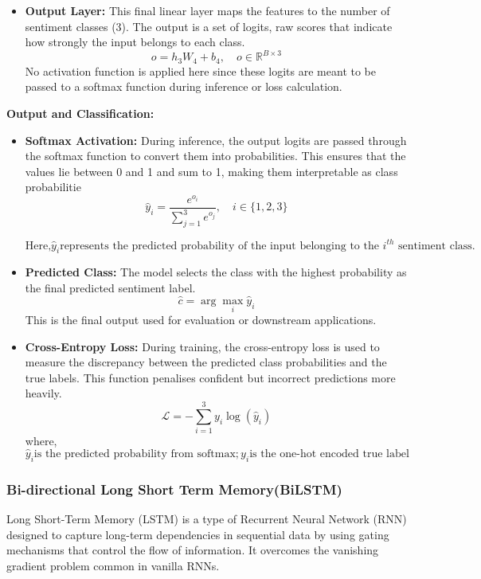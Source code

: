 \documentclass{article}
\begin{document}
\begin{itemize}
\begin{itemize}
\item \textbf{Output Layer:}
This final linear layer maps the features to the number of sentiment classes (3). The output is a set of logits, raw scores that indicate how strongly the input belongs to each class.
\[
o = h_3W_4 + b_4, \quad o \in \mathbb{R}^{B \times 3}
\]
No activation function is applied here since these logits are meant to be passed to a softmax function during inference or loss calculation.

\end{itemize}
\end{itemize}

\textbf{Output and Classification:}

\begin{itemize}
\item \textbf{Softmax Activation:}
During inference, the output logits are passed through the softmax function to convert them into probabilities. This ensures that the values lie between 0 and 1 and sum to 1, making them interpretable as class probabilitie
\[
\hat{y}_i = \frac{e^{o_i}}{\sum_{j=1}^{3} e^{o_j}}, \quad i \in \{1, 2, 3\}
\]

\[\text{Here,} \hat{y}_i  \text{represents the predicted probability of the input belonging to the } {i^{th}}  \text{ sentiment class.}\]

\item \textbf{Predicted Class:}
The model selects the class with the highest probability as the final predicted sentiment label.
\[
\hat{c} = \arg\max_i \hat{y}_i
\]
This is the final output used for evaluation or downstream applications.

\item \textbf{Cross-Entropy Loss:}
During training, the cross-entropy loss is used to measure the discrepancy between the predicted class probabilities and the true labels. This function penalises confident but incorrect predictions more heavily.
\[
\mathcal{L} = - \sum_{i=1}^{3} y_i \log(\hat{y}_i)
\]
where,
\[
 \hat{y}_i \text{is the predicted probability from softmax}; y_i \text{is the one-hot encoded true label}
\]
\end{itemize} 

\subsubsection{Bi-directional Long Short Term Memory(BiLSTM)}

Long Short-Term Memory (LSTM) is a type of Recurrent Neural Network (RNN) designed to capture long-term dependencies in sequential data by using gating mechanisms that control the flow of information. It overcomes the vanishing gradient problem common in vanilla RNNs. 
\end{document}
